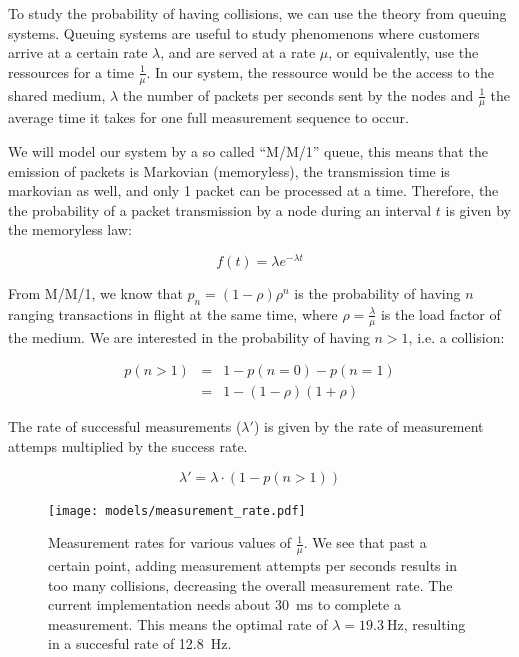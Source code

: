 \documentclass[a4paper, 12pt]{scrreprt}
\begin{document}
To study the probability of having collisions, we can use the theory from queuing systems\cite{hongler2017stochastic}.
Queuing systems are useful to study phenomenons where customers arrive at a certain rate $\lambda$, and are served at a rate $\mu$, or equivalently, use the ressources for a time $\frac{1}{\mu}$.
In our system, the ressource would be the access to the shared medium, $\lambda$ the number of packets per seconds sent by the nodes and $\frac{1}{\mu}$ the average time it takes for one full measurement sequence to occur.

We will model our system by a so called ``M/M/1'' queue, this means that the emission of packets is Markovian (memoryless), the transmission time is markovian as well, and only 1 packet can be processed at a time.
Therefore, the the probability of a packet transmission by a node during an interval $t$ is given by the memoryless law:

\begin{equation}
f(t) = \lambda e^{-\lambda t}
\end{equation}

From M/M/1, we know that $p_n = (1 - \rho) \rho^n$ is the probability of having $n$ ranging transactions in flight at the same time, where $\rho = \frac{\lambda}{\mu}$ is the load factor of the medium.
We are interested in the probability of having $n > 1$, i.e. a collision:

\begin{eqnarray}
    p(n>1) &=& 1 - p(n=0) - p(n=1) \\
       &=& 1 - (1 - \rho) (1 + \rho)
\end{eqnarray}

The rate of successful measurements ($\lambda'$) is given by the rate of measurement attemps multiplied by the success rate.

\begin{equation}
\lambda' = \lambda \cdot (1 - p(n>1))
\end{equation}


\begin{figure}[h]
    \centering
    \texttt{[image: models/measurement\_rate.pdf]}
    \caption{
        Measurement rates for various values of $\frac{1}{\mu}$.
        We see that past a certain point, adding measurement attempts per seconds results in too many collisions, decreasing the overall measurement rate.
        The current implementation needs about \SI{30}{\milli\second} to complete a measurement.
        This means the optimal rate of $\lambda = \SI{19.3}{\hertz}$, resulting in a succesful rate of \SI{12.8}{\hertz}.\label{fig:measurement-rate}
    }
\end{figure}
\end{document}
